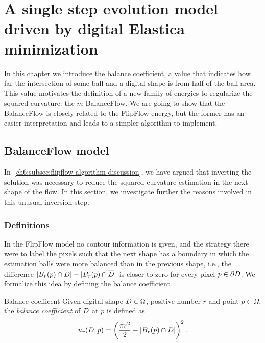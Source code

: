 \chapter{A single step evolution model driven by digital Elastica minimization}
\label{chapter:balance-flow}


In this chapter we introduce the balance coefficient, a value that indicates how far the intersection of some ball and a digital shape is from half of the ball area. This value motivates the definition of a new family of energies to regularize the squared curvature: the $m$-BalanceFlow. We are going to show that the BalanceFlow is closely related to the FlipFlow energy, but the former has an easier interpretation and leads to a simpler algorithm to implement.


\section{BalanceFlow model}
In~\cref{ch6:subsec:flipflow-algorithm-discussion}, we have argued that inverting the solution was necessary to reduce the squared curvature estimation in the next shape of the flow. In this section, we investigate further the reasons involved in this unusual inversion step. 

\subsection{Definitions}

In the FlipFlow model no contour information is given, and the strategy there were to label the pixels such that the next shape has a boundary in which the estimation balls were more balanced than in the previous shape, i.e., the difference $|B_r(p) \cap D| - |B_r(p) \cap \overline{D}|$ is closer to zero for every pixel $p \in \partial D$.  We formalize this idea by defining the balance coefficient.

\begin{definition}{Balance coefficent}
Given digital shape $D \in \Omega$, positive number $r$ and point $p \in \Omega$, the \emph{balance coefficient} of $D$ at $p$ is defined as
\begin{align*}
	u_r(D,p) = \left( \frac{\pi r^2}{2} - |B_r(p) \cap D| \right)^2.
\end{align*}
%
\end{definition}

